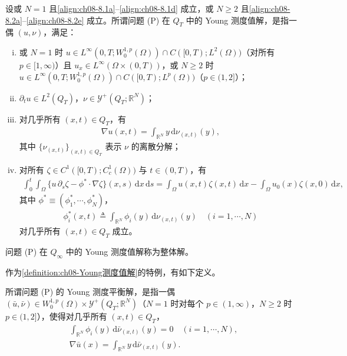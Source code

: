\documentclass[../../main.tex]{subfiles}%
\begin{document}
\begin{definition}\label{definition:ch08-Young测度值解}
设或 $N=1$ 且\eqref{align:ch08-8.1a}--\eqref{align:ch08-8.1d} 成立，或 $N\geqslant2$ 且\eqref{align:ch08-8.2a}--\eqref{align:ch08-8.2e} 成立。所谓问题 (P) 在 $Q_T$ 中的 Young 测度值解，是指一偶 $(u,\nu)$，满足：
\begin{enumerate}[(i)]
\item\label{item:ch08-ymvs-i} 或 $N=1$ 时 $u\in L^\infty(0,T;W^{1,p}_0(\Omega))\cap C([0,T);L^2(\Omega))$（对所有 $p\in[1,\infty)$）且 $u_x\in L^\infty(\Omega\times(0,T))$，或 $N\geqslant2$ 时 $u\in L^\infty(0,T;W^{1,p}_0(\Omega))\cap C([0,T);L^p(\Omega))$（$p\in(1,2]$）；
\item\label{item:ch08-ymvs-ii} $\partial_t u\in L^2(Q_T)$，$\nu\in\mathcal{Y}^+(Q_T;\mathbb{R}^N)$；
\item\label{item:ch08-ymvs-iii} 对几乎所有 $(x,t)\in Q_T$，有
\begin{align}
\nabla u(x,t)=\int_{\mathbb{R}^N}y\,\mathrm{d}\nu_{(x,t)}(y), \label{align:ch08-8.4}
\end{align}
其中 $\{\nu_{(x,t)}\}_{(x,t)\in Q_T}$ 表示 $\nu$ 的离散分解；
\item\label{item:ch08-ymvs-iv} 对所有 $\zeta\in C^1([0,T);C^1_c(\Omega))$ 与 $t\in(0,T)$，有
\begin{align}
\int_0^t\int_\Omega\{u\,\partial_s\zeta-\phi^*\cdot\nabla\zeta\}(x,s)\,\mathrm{d}x\,\mathrm{d}s
=\int_\Omega u(x,t)\zeta(x,t)\,\mathrm{d}x-\int_\Omega u_0(x)\zeta(x,0)\,\mathrm{d}x, \label{align:ch08-8.5}
\end{align}
其中 $\phi^*\equiv(\phi^*_1,\cdots ,\phi^*_N)$，
\begin{align}
\phi^*_i(x,t)\triangleq \int_{\mathbb{R}^N}\phi_i(y)\,\mathrm{d}\nu_{(x,t)}(y)\quad(i=1,\cdots ,N) \label{align:ch08-8.6}
\end{align}
对几乎所有 $(x,t)\in Q_T$ 成立。
\end{enumerate}
问题 (P) 在 $Q_\infty$ 中的 Young 测度值解称为整体解。
\end{definition}

作为\cref{definition:ch08-Young测度值解}的特例，有如下定义。

\begin{definition}\label{definition:ch08-Young平衡解}
所谓问题 (P) 的 Young 测度平衡解，是指一偶 $(\bar u,\bar\nu)\in W^{1,p}_0(\Omega)\times\mathcal{Y}^+(Q_T;\mathbb{R}^N)$（$N=1$ 时对每个 $p\in(1,\infty)$，$N\geqslant2$ 时 $p\in(1,2]$），使得对几乎所有 $(x,t)\in Q_T$，
\begin{align}
\int_{\mathbb{R}^N}\phi_i(y)\,\mathrm{d}\bar\nu_{(x,t)}(y)=0\quad(i=1,\cdots ,N), \label{align:ch08-8.7}\\
\nabla\bar u(x)=\int_{\mathbb{R}^N}y\,\mathrm{d}\bar\nu_{(x,t)}(y). \label{align:ch08-8.8}
\end{align}
\end{definition}
\end{document}

